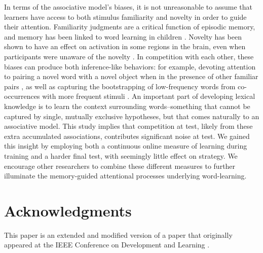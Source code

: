 \documentclass[man,floatsintext]{apa6}
\begin{document}
In terms of the associative model's biases, it is not unreasonable to assume that learners have access to both stimulus familiarity and novelty in order to guide their attention. Familiarity judgments are a critical function of episodic memory, and memory has been linked to word learning in children \citep{Vlach:2012eq}. Novelty has been shown to have an effect on activation in some regions in the brain, even when participants were unaware of the novelty \citep{Berns:1997}. In competition with each other, these biases can produce both inference-like behaviors: for example, devoting attention to pairing a novel word with a novel object when in the presence of other familiar pairs \citep{Kachergis:2012gi}, as well as capturing the bootstrapping of low-frequency words from co-occurrences with more frequent stimuli \citep{Kachergis:2016}. An important part of developing lexical knowledge is to learn the context surrounding words--something that cannot be captured by single, mutually exclusive hypotheses, but that comes naturally to an associative model. This study implies that competition at test, likely from these extra accumulated associations, contributes significant noise at test. We gained this insight by employing both a continuous online measure of learning during training and a harder final test, with seemingly little effect on strategy. We encourage other researchers to combine these different measures to further illuminate the memory-guided attentional processes underlying word-learning.

\section{Acknowledgments}

This paper is an extended and modified version of a paper that originally appeared at the IEEE Conference on Development and Learning \citep{Kachergis:2014}.




\end{document}
